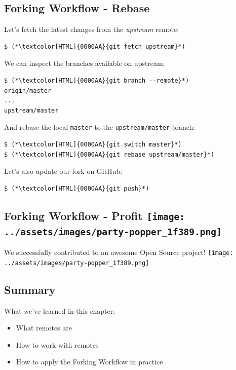 \subsection{Forking Workflow - Rebase}
\begin{frame}[fragile]
  \subslidetitle

  Let's fetch the latest changes from the \textit{upstream} remote:

  \begin{lstlisting}
$ (*\textcolor[HTML]{0000AA}{git fetch upstream}*)
\end{lstlisting}

  We can inspect the branches available on upstream:

  \begin{lstlisting}
$ (*\textcolor[HTML]{0000AA}{git branch --remote}*)
origin/master
...
upstream/master
\end{lstlisting}

  And rebase the local \lstinline{master} to the \lstinline{upstream/master} branch:

  \begin{lstlisting}
$ (*\textcolor[HTML]{0000AA}{git switch master}*)
$ (*\textcolor[HTML]{0000AA}{git rebase upstream/master}*)
\end{lstlisting}

  Let's also update our fork on GitHub:

  \begin{lstlisting}
$ (*\textcolor[HTML]{0000AA}{git push}*)
\end{lstlisting}

\end{frame}

\subsection{Forking Workflow - Profit \texttt{[image: ../assets/images/party-popper\_1f389.png]}}
\begin{frame}[fragile]
  \subslidetitle

  \vspace{8em}
  \begin{center}
      We successfully contributed to an awesome Open Source project! \texttt{[image: ../assets/images/party-popper\_1f389.png]}
  \end{center}

\end{frame}

\subsection{Summary}
\begin{frame}[fragile]
\subslidetitle
  What we've learned in this chapter:
  \begin{itemize}
    \item What remotes are
    \item How to work with remotes
    \item How to apply the Forking Workflow in practice
  \end{itemize}
\end{frame}
